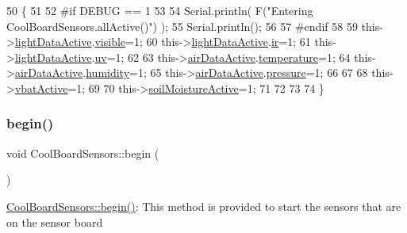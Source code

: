 \begin{DoxyCode}
50 \{
51 
52 \textcolor{preprocessor}{#if DEBUG == 1 }
53 
54     Serial.println( F(\textcolor{stringliteral}{"Entering CoolBoardSensors.allActive()"}) );
55     Serial.println();
56 
57 \textcolor{preprocessor}{#endif}
58     
59     this->\hyperlink{class_cool_board_sensors_ac4deb1cf41bac8b91c780c92fab00ba4}{lightDataActive}.\hyperlink{struct_cool_board_sensors_1_1light_active_abcbba296b6a95e67c0cd2555d9dd50c7}{visible}=1;
60     this->\hyperlink{class_cool_board_sensors_ac4deb1cf41bac8b91c780c92fab00ba4}{lightDataActive}.\hyperlink{struct_cool_board_sensors_1_1light_active_a67700895349b95ceb263f1a6da756315}{ir}=1;
61     this->\hyperlink{class_cool_board_sensors_ac4deb1cf41bac8b91c780c92fab00ba4}{lightDataActive}.\hyperlink{struct_cool_board_sensors_1_1light_active_a949a7aaf5166d981de8fe0fd93da20d6}{uv}=1;    
62 
63     this->\hyperlink{class_cool_board_sensors_abff8dfeccb2f7689847bb64d5f1cd31e}{airDataActive}.\hyperlink{struct_cool_board_sensors_1_1air_active_a9a6633c426b0508e30ebc1832ec6d745}{temperature}=1;
64     this->\hyperlink{class_cool_board_sensors_abff8dfeccb2f7689847bb64d5f1cd31e}{airDataActive}.\hyperlink{struct_cool_board_sensors_1_1air_active_ae5740445054b27415e22f450576accb7}{humidity}=1;
65     this->\hyperlink{class_cool_board_sensors_abff8dfeccb2f7689847bb64d5f1cd31e}{airDataActive}.\hyperlink{struct_cool_board_sensors_1_1air_active_ab200826a70d1dc9945f5efb6b9c732ed}{pressure}=1;
66 
67 
68     this->\hyperlink{class_cool_board_sensors_af5039ad760b0ff0aa7eee16c55e81702}{vbatActive}=1;
69 
70     this->\hyperlink{class_cool_board_sensors_a31983eecc0f9cd000e1f912206ea4dc8}{soilMoistureActive}=1;
71     
72 
73 
74 \}
\end{DoxyCode}
\mbox{\label{class_cool_board_sensors_a97095823ef7c8f5290812f1405b966b3}} 
\subsubsection{\texorpdfstring{begin()}{begin()}}
{\footnotesize\ttfamily void Cool\+Board\+Sensors\+::begin (\begin{DoxyParamCaption}{ }\end{DoxyParamCaption})}

\hyperlink{class_cool_board_sensors_a97095823ef7c8f5290812f1405b966b3}{Cool\+Board\+Sensors\+::begin()}\+: This method is provided to start the sensors that are on the sensor board 

